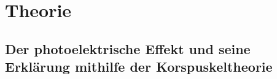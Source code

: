 
\section{Theorie}
\label{sec:Theorie}
 \subsection{Der photoelektrische Effekt und seine Erklärung mithilfe der Korspuskeltheorie  }
